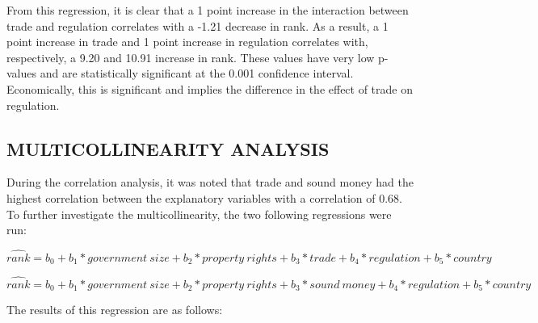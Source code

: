 \documentclass[
  11pt,
]{article}
\begin{document}
From this regression, it is clear that a 1 point increase in the
interaction between trade and regulation correlates with a -1.21
decrease in rank. As a result, a 1 point increase in trade and 1 point
increase in regulation correlates with, respectively, a 9.20 and 10.91
increase in rank. These values have very low p-values and are
statistically significant at the 0.001 confidence interval.
Economically, this is significant and implies the difference in the
effect of trade on regulation.

\hypertarget{multicollinearity-analysis}{%
\subsection{MULTICOLLINEARITY
ANALYSIS}\label{multicollinearity-analysis}}

During the correlation analysis, it was noted that trade and sound money
had the highest correlation between the explanatory variables with a
correlation of 0.68. To further investigate the multicollinearity, the
two following regressions were run:

\[ \hat{rank} = b_0 + b_1 * government \ size + b_2 * property \ rights + b_3 * trade + b_4 * regulation + b_5 * country \]

\[ \hat{rank} = b_0 + b_1 * government \ size + b_2 * property \ rights + b_3 * sound \ money + b_4 * regulation + b_5 * country \]

The results of this regression are as follows:
\end{document}
